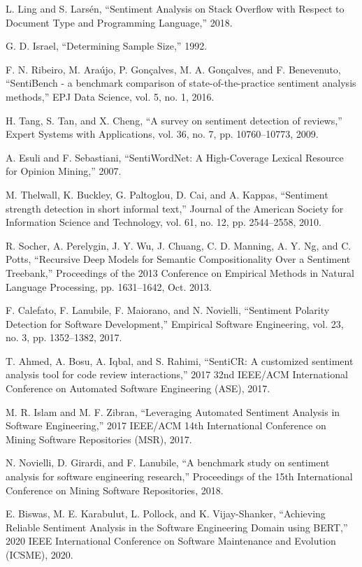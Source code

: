 \documentclass[conference]{IEEEtran}
\begin{document}
\begin{thebibliography}{00}
 L. Ling and S. Larsén, “Sentiment Analysis on Stack Overflow with Respect to Document Type and Programming Language,” 2018. 

 G. D. Israel, “Determining Sample Size,” 1992. 

 F. N. Ribeiro, M. Araújo, P. Gonçalves, M. A. Gonçalves, and F. Benevenuto, “SentiBench - a benchmark comparison of state-of-the-practice sentiment analysis methods,” EPJ Data Science, vol. 5, no. 1, 2016. 

 H. Tang, S. Tan, and X. Cheng, “A survey on sentiment detection of reviews,” Expert Systems with Applications, vol. 36, no. 7, pp. 10760–10773, 2009. 

 A. Esuli and F. Sebastiani, “SentiWordNet: A High-Coverage Lexical Resource for Opinion Mining,” 2007. 

 M. Thelwall, K. Buckley, G. Paltoglou, D. Cai, and A. Kappas, “Sentiment strength detection in short informal text,” Journal of the American Society for Information Science and Technology, vol. 61, no. 12, pp. 2544–2558, 2010. 

 R. Socher, A. Perelygin, J. Y. Wu, J. Chuang, C. D. Manning, A. Y. Ng, and C. Potts, “Recursive Deep Models for Semantic Compositionality Over a Sentiment Treebank,” Proceedings of the 2013 Conference on Empirical Methods in Natural Language Processing, pp. 1631–1642, Oct. 2013. 

 F. Calefato, F. Lanubile, F. Maiorano, and N. Novielli, “Sentiment Polarity Detection for Software Development,” Empirical Software Engineering, vol. 23, no. 3, pp. 1352–1382, 2017. 

 T. Ahmed, A. Bosu, A. Iqbal, and S. Rahimi, “SentiCR: A customized sentiment analysis tool for code review interactions,” 2017 32nd IEEE/ACM International Conference on Automated Software Engineering (ASE), 2017. 

 M. R. Islam and M. F. Zibran, “Leveraging Automated Sentiment Analysis in Software Engineering,” 2017 IEEE/ACM 14th International Conference on Mining Software Repositories (MSR), 2017.

 N. Novielli, D. Girardi, and F. Lanubile, “A benchmark study on sentiment analysis for software engineering research,” Proceedings of the 15th International Conference on Mining Software Repositories, 2018. 

 E. Biswas, M. E. Karabulut, L. Pollock, and K. Vijay-Shanker, “Achieving Reliable Sentiment Analysis in the Software Engineering Domain using BERT,” 2020 IEEE International Conference on Software Maintenance and Evolution (ICSME), 2020.


\end{thebibliography}
\end{document}
